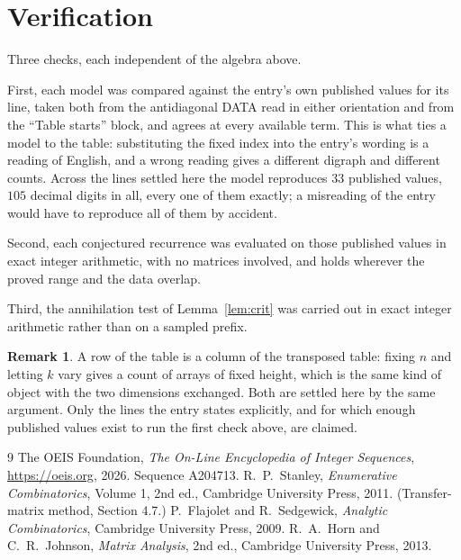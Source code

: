 \documentclass[11pt,a4paper]{article}
\theoremstyle{plain}
\theoremstyle{definition}
\newtheorem{remark}[theorem]{Remark}
\begin{document}
\section{Verification}

Three checks, each independent of the algebra above.

First, each model was compared against the entry's own published values for its line, taken
both from the antidiagonal DATA read in either orientation and from the ``Table starts''
block, and agrees at every available term. This is what ties a model to the table:
substituting the fixed index into the entry's wording is a reading of English, and a wrong
reading gives a different digraph and different counts. Across the lines settled here the
model reproduces $33$ published values, $105$ decimal digits in all, every one of
them exactly; a misreading of the entry would have to reproduce all of them by accident.

Second, each conjectured recurrence was evaluated on those published values in exact
integer arithmetic, with no matrices involved, and holds wherever the proved range and the
data overlap.

Third, the annihilation test of Lemma~\ref{lem:crit} was carried out in exact integer
arithmetic rather than on a sampled prefix.

\begin{remark}
A row of the table is a column of the transposed table: fixing $n$ and letting $k$ vary gives a
count of arrays of fixed height, which is the same kind of object with the two dimensions
exchanged. Both are settled here by the same argument. Only the lines the entry states
explicitly, and for which enough published values exist to run the first check above, are
claimed.
\end{remark}

\begin{thebibliography}{9}
 The OEIS Foundation, \emph{The On-Line Encyclopedia of Integer
Sequences}, \url{https://oeis.org}, 2026. Sequence A204713.
 R.~P.~Stanley, \emph{Enumerative Combinatorics}, Volume 1, 2nd ed.,
Cambridge University Press, 2011. (Transfer-matrix method, Section 4.7.)
 P.~Flajolet and R.~Sedgewick, \emph{Analytic Combinatorics}, Cambridge
University Press, 2009.
 R.~A.~Horn and C.~R.~Johnson, \emph{Matrix Analysis}, 2nd ed., Cambridge
University Press, 2013.
\end{thebibliography}
\end{document}
